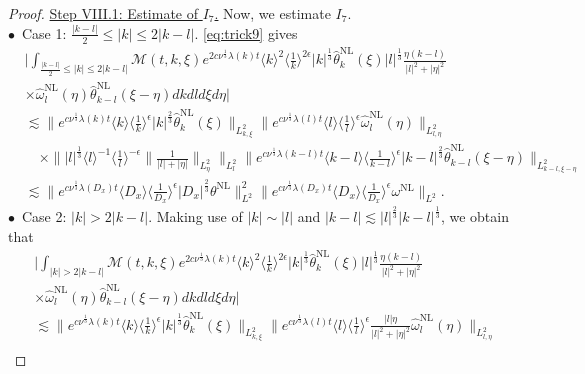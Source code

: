 \documentclass[reqno, 12pt]{amsart} %
\theoremstyle{plain} %
\theoremstyle{definition}
\theoremstyle{remark}
\numberwithin{equation}{section} %
\begin{document}
\begin{proof}
		\underline{ Step VIII.1: Estimate of $I_7$.}    
		Now, we estimate $I_7$.\\
		$\bullet$~Case 1:   $\frac{|k-l|}{2} \leq |k| \leq 2|k-l|$. \eqref{eq:trick9} gives
		\begin{align*}
			& \bigg| \int_{\frac{|k-l|}{2} \leq |k| \leq 2|k-l|} \mathcal{M}(t, k, \xi) e^{2 c \nu^{\frac{1}{3}} \lambda(k) t}\langle k\rangle^2\langle\frac{1}{k}\rangle^{2 \epsilon} |k|^\frac13\hat{\theta}_k^{\mathrm{NL}}(\xi) |l|^\frac13  \frac{\eta(k-l)}{|l|^2+|\eta|^2}  \\
			& \times \hat{\omega}_l^{\mathrm{NL}}(\eta) \hat{\theta}_{k-l}^{\mathrm{NL}}(\xi-\eta) d k d l d \xi d \eta \bigg| \\
			& \lesssim\|e^{c \nu^{\frac{1}{3}} \lambda(k) t}  \langle k \rangle \langle \frac1k \rangle^\epsilon |k|^\frac23  \hat{\theta}_k^{\mathrm{NL}}(\xi)\|_{L_{k, \xi}^2}\|e^{c \nu^{\frac{1}{3}} \lambda(l) t}\langle l\rangle\langle\frac{1}{l}\rangle^\epsilon \hat{\omega}_l^{\mathrm{NL}}(\eta)\|_{L_{l, \eta}^2}  \\
			& \quad \times   \||l|^\frac13 \langle l\rangle^{-1}\langle\frac{1}{l}\rangle^{-\epsilon}\| \frac{1}{|l|+|\eta|}\|_{L_\eta^2}\|_{L_l^2} \|e^{c \nu^{\frac{1}{3}} \lambda(k-l) t}\langle k-l \rangle \langle \frac{1}{k-l} \rangle^\epsilon |k-l|^{\frac23}  \hat{\theta}_{k-l}^{\mathrm{NL}}(\xi-\eta)\|_{L_{k-l, \xi-\eta}^2} \\
			& \lesssim\|e^{c \nu^{\frac{1}{3}} \lambda\left(D_x\right) t}\langle D_x\rangle    \langle \frac{1}{D_x}\rangle^\epsilon  \left|D_x\right|^{\frac{2}{3}} \theta^{\mathrm{NL}}\|_{L^2}^2 \|e^{c \nu^{\frac{1}{3}} \lambda\left(D_x\right) t}\langle D_x\rangle\langle\frac{1}{D_x}\rangle^\epsilon \omega^{\mathrm{NL}}\|_{L^2} .
		\end{align*}
		$\bullet$~Case 2:   $|k| > 2|k-l| $. Making use of $ |k|\sim |l|$ and $|k-l|\lesssim  |l|^\frac23 |k-l|^\frac13 $,  we obtain that
		\begin{align*}
			& \bigg| \int_{|k| > 2|k-l| } \mathcal{M}(t, k, \xi) e^{2 c \nu^{\frac{1}{3}} \lambda(k) t}\langle k\rangle^2\langle\frac{1}{k}\rangle^{2 \epsilon} |k|^\frac13\hat{\theta}_k^{\mathrm{NL}}(\xi) |l|^\frac13  \frac{\eta(k-l)}{|l|^2+|\eta|^2} \\
			& \times \hat{\omega}_l^{\mathrm{NL}}(\eta) \hat{\theta}_{k-l}^{\mathrm{NL}}(\xi-\eta) d k d l d \xi d \eta \bigg| \\
			& \lesssim\|e^{c \nu^{\frac{1}{3}} \lambda(k) t}  \langle k \rangle \langle \frac1k \rangle^\epsilon |k|^\frac13  \hat{\theta}_k^{\mathrm{NL}}(\xi)\|_{L_{k, \xi}^2}\|e^{c \nu^{\frac{1}{3}} \lambda(l) t}\langle l\rangle\langle\frac{1}{l}\rangle^\epsilon   \frac{|l|\eta}{|l|^2  + |\eta|^2} \hat{\omega}_l^{\mathrm{NL}}(\eta)\|_{L_{l, \eta}^2}         \\

\end{align*}
\end{proof}
\end{document}
